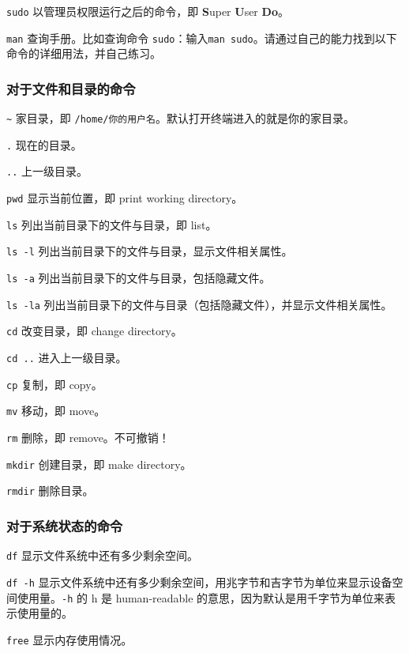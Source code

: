 \documentclass[UTF-8]{ctexart}
\begin{document}
				\texttt{sudo} 以管理员权限运行之后的命令，即 \textbf{S}uper \textbf{U}ser \textbf{Do}。
				
				\texttt{man} 查询手册。比如查询命令 \texttt{sudo}：输入\texttt{man sudo}。请通过自己的能力找到以下命令的详细用法，并自己练习。
			
			\subsubsection{对于文件和目录的命令}
			
				\texttt{\textasciitilde} 家目录，即 \texttt{/home/你的用户名}。默认打开终端进入的就是你的家目录。
				
				\texttt{.} 现在的目录。
				
				\texttt{..} 上一级目录。
				
				\texttt{pwd} 显示当前位置，即 print working directory。
				
				\texttt{ls} 列出当前目录下的文件与目录，即 list。
				
				\texttt{ls -l} 列出当前目录下的文件与目录，显示文件相关属性。
				
				\texttt{ls -a} 列出当前目录下的文件与目录，包括隐藏文件。
				
				\texttt{ls -la} 列出当前目录下的文件与目录（包括隐藏文件），并显示文件相关属性。
				
				\texttt{cd} 改变目录，即 change directory。
				
				\texttt{cd ..} 进入上一级目录。
				
				\texttt{cp} 复制，即 copy。
				
				\texttt{mv} 移动，即 move。
				
				\texttt{rm} 删除，即 remove。不可撤销！
				
				\texttt{mkdir} 创建目录，即 make directory。
				
				\texttt{rmdir} 删除目录。
				
			\subsubsection{对于系统状态的命令}
			
				\texttt{df} 显示文件系统中还有多少剩余空间。
				
				\texttt{df -h} 显示文件系统中还有多少剩余空间，用兆字节和吉字节为单位来显示设备空间使用量。\texttt{-h} 的 h 是 human-readable 的意思，因为默认是用千字节为单位来表示使用量的。
				
				\texttt{free} 显示内存使用情况。
				
\end{document}
